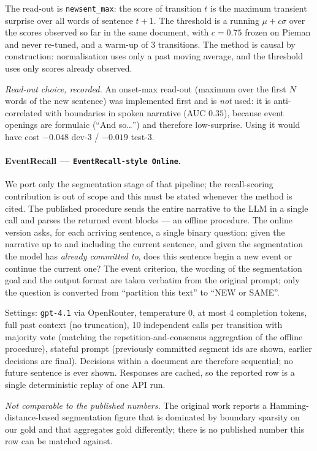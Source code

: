 The read-out is \texttt{newsent\_max}: the score of transition $t$ is the
maximum transient surprise over all words of sentence $t+1$. The threshold is a
running $\mu + c\sigma$ over the scores observed so far in the same document,
with $c = 0.75$ frozen on Pieman and never re-tuned, and a warm-up of 3
transitions. The method is causal by construction: normalisation uses only a
past moving average, and the threshold uses only scores already observed.

\emph{Read-out choice, recorded.} An onset-max read-out (maximum over the first
$N$ words of the new sentence) was implemented first and is \emph{not} used: it
is anti-correlated with boundaries in spoken narrative (AUC $0.35$), because
event openings are formulaic (``And so\ldots'') and therefore low-surprise.
Using it would have cost $-0.048$ dev-3 / $-0.019$ test-3.

\paragraph{EventRecall \citep{panela2025event} ---
\texttt{EventRecall-style Online}.}
We port only the segmentation stage of that pipeline; the recall-scoring
contribution is out of scope and this must be stated whenever the method is
cited. The published procedure sends the entire narrative to the LLM in a single
call and parses the returned event blocks --- an offline procedure. The online
version asks, for each arriving sentence, a single binary question: given the
narrative up to and including the current sentence, and given the segmentation
the model has \emph{already committed to}, does this sentence begin a new event
or continue the current one? The event criterion, the wording of the
segmentation goal and the output format are taken verbatim from the original
prompt; only the question is converted from ``partition this text'' to ``NEW or
SAME''.

Settings: \texttt{gpt-4.1} via OpenRouter, temperature $0$, at most 4 completion
tokens, full past context (no truncation), 10 independent calls per transition
with majority vote (matching the repetition-and-consensus aggregation of the
offline procedure), stateful prompt (previously committed segment ids are shown,
earlier decisions are final). Decisions within a document are therefore
sequential; no future sentence is ever shown. Responses are cached, so the
reported row is a single deterministic replay of one API run.

\emph{Not comparable to the published numbers.} The original work reports a
Hamming-distance-based segmentation figure that is dominated by boundary
sparsity on our gold and that aggregates gold differently; there is no published
number this row can be matched against.

